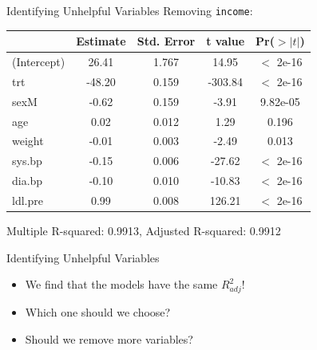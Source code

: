 \begin{frame}{Identifying Unhelpful Variables}
    Removing \texttt{income}:
    \begin{table}[h]
        \centering
        \begin{tabular}{lcccc}
            \hline
                        & Estimate & Std. Error & t value & Pr($>|t|$) \\
            \hline
            (Intercept) & 26.41 & 1.767 & 14.95 & $<$ 2e-16 \\
            trt       &  -48.20 & 0.159 & -303.84 & $<$ 2e-16 \\
            sexM      &   -0.62 & 0.159 & -3.91 & 9.82e-05 \\
            age       &    0.02 & 0.012 &  1.29 &  0.196  \\ 
            weight    &   -0.01 & 0.003 & -2.49 &  0.013 \\ 
            sys.bp    &   -0.15 & 0.006 & -27.62 & $<$ 2e-16 \\
            dia.bp    &   -0.10 & 0.010 & -10.83 & $<$ 2e-16 \\
            ldl.pre   &    0.99 & 0.008 & 126.21 & $<$ 2e-16 \\
            \hline
        \end{tabular}
    \end{table}
    Multiple R-squared:  0.9913,	Adjusted R-squared:  0.9912 
\end{frame}

\begin{frame}{Identifying Unhelpful Variables}
    \begin{itemize}
        \item We find that the models have the same $R^2_{adj}$!
        \item Which one should we choose?
        \item Should we remove more variables?
    \end{itemize}
\end{frame}

